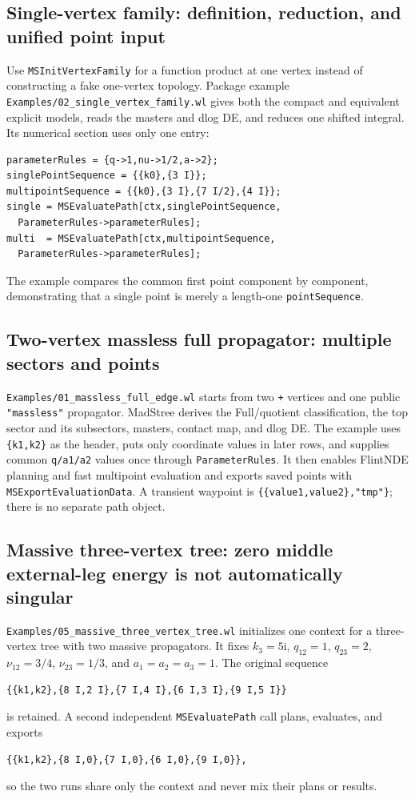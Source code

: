 \documentclass[11pt,a4paper]{article}
\newcommand{\ii}{\mathrm i}
\begin{document}
\subsection{Single-vertex family: definition, reduction, and unified point input}

Use \texttt{MSInitVertexFamily} for a function product at one vertex instead of constructing a fake
one-vertex topology. Package example
\texttt{Examples/02\_single\_vertex\_family.wl} gives both the compact and equivalent explicit
models, reads the masters and dlog DE, and reduces one shifted integral. Its numerical section uses
only one entry:
\begin{verbatim}
parameterRules = {q->1,nu->1/2,a->2};
singlePointSequence = {{k0},{3 I}};
multipointSequence = {{k0},{3 I},{7 I/2},{4 I}};
single = MSEvaluatePath[ctx,singlePointSequence,
  ParameterRules->parameterRules];
multi  = MSEvaluatePath[ctx,multipointSequence,
  ParameterRules->parameterRules];
\end{verbatim}
The example compares the common first point component by component, demonstrating that a single
point is merely a length-one \texttt{pointSequence}.

\subsection{Two-vertex massless full propagator: multiple sectors and points}

\texttt{Examples/01\_massless\_full\_edge.wl} starts from two \texttt{+} vertices and one public
\texttt{"massless"} propagator. MadStree derives the Full/quotient classification, the top sector and its subsectors,
masters, contact map, and dlog DE. The example uses \texttt{\{k1,k2\}} as the header, puts only
coordinate values in later rows, and supplies common \texttt{q/a1/a2} values once through
\texttt{ParameterRules}. It then enables FlintNDE planning and fast multipoint evaluation and
exports saved points with \texttt{MSExportEvaluationData}. A transient waypoint is
\texttt{\{\{value1,value2\},"tmp"\}}; there is no separate path object.

\subsection{Massive three-vertex tree: zero middle external-leg energy is not automatically singular}

\texttt{Examples/05\_massive\_three\_vertex\_tree.wl} initializes one context for a three-vertex
tree with two massive propagators. It fixes $k_3=5\ii$, $q_{12}=1$, $q_{23}=2$,
$\nu_{12}=3/4$, $\nu_{23}=1/3$, and $a_1=a_2=a_3=1$. The original sequence
\begin{verbatim}
{{k1,k2},{8 I,2 I},{7 I,4 I},{6 I,3 I},{9 I,5 I}}
\end{verbatim}
is retained. A second independent \texttt{MSEvaluatePath} call plans, evaluates, and exports
\begin{verbatim}
{{k1,k2},{8 I,0},{7 I,0},{6 I,0},{9 I,0}},
\end{verbatim}
so the two runs share only the context and never mix their plans or results.
\end{document}
